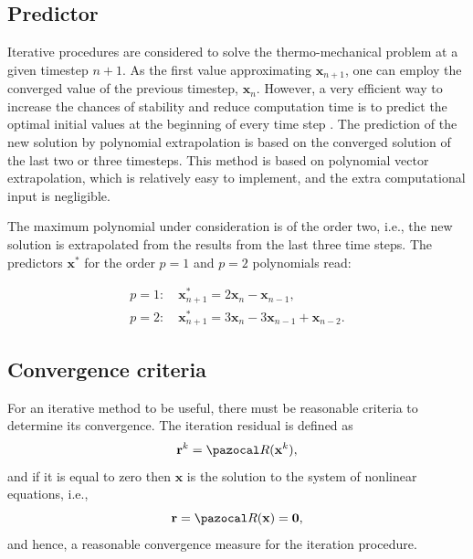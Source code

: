 \subsection{Predictor}

Iterative procedures are considered to solve the thermo-mechanical problem at a given timestep \(n+1\).
As the first value approximating \(\mathbf x_{n+1}\), one can employ the converged value of the previous timestep, \(\mathbf x_n\).
However, a very efficient way to increase the chances of stability and reduce computation time is to predict the optimal initial values at the beginning of every time step \citep{erbts_accelerated_2012, erbts_partitioned_2015, wendt_partitioned_2015}.
The prediction of the new solution by polynomial extrapolation is based on the converged solution of the last two or three timesteps.
This method is based on polynomial vector extrapolation, which is relatively easy to implement, and the extra computational input is negligible.

The maximum polynomial under consideration is of the order two, i.e., the new solution is extrapolated from the results from the last three time steps.
The predictors $\mathbf{x}^{*}$ for the order $p=1$ and $p=2$ polynomials read:
\begin{highlight}[innertopmargin=-5pt]
\begin{gather}
p=1:\quad \mathbf{x}_{n+1}^{*}=2 \mathbf{x}_{n}-\mathbf{x}_{n-1}, \\
p=2:\quad \mathbf{x}_{n+1}^{*}=3 \mathbf{x}_{n}-3 \mathbf{x}_{n-1}+\mathbf{x}_{n-2}.
\end{gather}
\end{highlight}

\subsection{Convergence criteria}

For an iterative method to be useful, there must be reasonable criteria to determine its convergence.
The iteration residual is defined as
\begin{equation}
\mathbf r^{k} = \pazocal R(\mathbf x^{k}),
\end{equation}
and if it is equal to zero then $\mathbf x$ is the solution to the system of nonlinear equations, i.e.,
\begin{equation} \label{eq:residual_definition}
\mathbf r = \pazocal R(\mathbf x) = \mathbf 0,
\end{equation}
and hence, a reasonable convergence measure for the iteration procedure.

